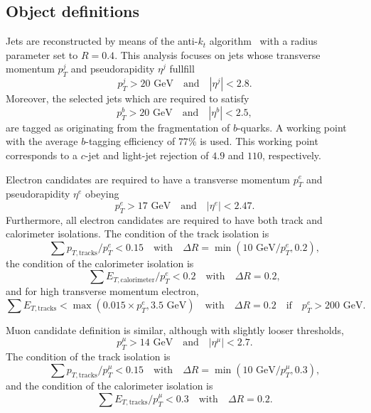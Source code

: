 \documentclass{ws-mpla}
\begin{document}
\subsection{Object definitions}

Jets are reconstructed by means of the anti-$k_t$ algorithm~\cite{Cacciari:2008gp} with a radius parameter set to $R=0.4$. This analysis focuses on jets whose transverse momentum $p^j_T$ and pseudorapidity $\eta^j$ fullfill
\begin{equation}
p^j_T > 20\textrm{ GeV}\quad \textrm{and}\quad |\eta^j| < 2.8.
\end{equation} 
Moreover, {\color{blue}the selected jets which are required to satisfy 
\begin{equation}
p^b_T > 20 \textrm{ GeV}\quad \textrm{and}\quad |\eta^b| < 2.5,
\end{equation}
are tagged as originating from the fragmentation of $b$-quarks.}
A working point with the average $b$-tagging efficiency of $77\%$ is used. This working point corresponds to a $c$-jet and light-jet rejection of $4.9$ and $110$, respectively.

Electron candidates are required to have a transverse momentum $p^e_T$ and pseudorapidity $\eta^e$ obeying
\begin{equation}
p^e_T > 17 \textrm{ GeV}\quad \textrm{and}\quad |\eta^e| < 2.47.
\end{equation}
Furthermore, all electron candidates are required to have both track and calorimeter isolations. The condition of the track isolation is
\begin{equation}
\sum p_{T,\textrm{tracks}}/p^e_T < 0.15\quad \textrm{with}\quad \Delta R=\min(10\textrm{ GeV}/p^e_T,0.2),
\end{equation}
the condition of the calorimeter isolation is
\begin{equation}
\sum E_{T,\textrm{calorimeter}}/p^e_T < 0.2\quad \textrm{with}\quad \Delta R=0.2,
\end{equation}
and for high transverse momentum electron, 
\begin{equation}
\sum E_{T,\textrm{tracks}} < \max(0.015\times p^e_T,3.5\textrm{ GeV})\quad \textrm{with}\quad \Delta R=0.2\quad \textrm{if}\quad p^e_T > 200\textrm{ GeV}.
\end{equation}

Muon candidate definition is similar, although with slightly looser thresholds,
\begin{equation}
p^{\mu}_T > 14 \textrm{ GeV}\quad \textrm{and}\quad |\eta^{\mu}| < 2.7.
\end{equation}
The condition of the track isolation is 
\begin{equation}
\sum p_{T,\textrm{tracks}}/p^{\mu}_T < 0.15\quad \textrm{with}\quad \Delta R=\min(10\textrm{ GeV}/p^{\mu}_T,0.3),
\end{equation}
and the condition of the calorimeter isolation is
\begin{equation}
\sum E_{T,\textrm{tracks}}/p^{\mu}_T < 0.3\quad \textrm{with}\quad \Delta R=0.2.
\end{equation}
\end{document}
